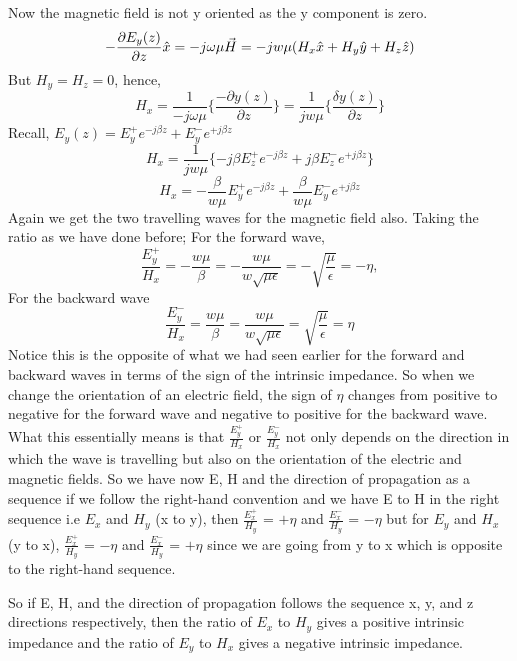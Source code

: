 Now the magnetic field is not y oriented as the y component is zero.
\begin{dmath*}
-\pdv{E_y(z)}{z}\hat{x} = -j\omega\mu\vec{H} = -jw\mu (H_x\hat{x} + H_y\hat{y} + H_z\hat{z}) 
\end{dmath*}
But	$H_y = H_z = 0$, hence,
\begin{dmath*}
H_x = \frac{1}{-j\omega\mu}\{\frac{-\partial y(z)}{\partial z}\} = \frac{1}{jw\mu}\{\frac{\delta y(z)}{\partial z}\}
\end{dmath*} 
Recall,
$E_y(z) = E_y^+ e^{-j\beta z} + E_y^- e^{+j\beta z}$
\begin{dmath*}
H_x= \frac{1}{jw\mu} \{-j\beta E_z^+e^{-j\beta z} + j\beta E_z^-e^{+j\beta z} \}
\end{dmath*}
\begin{dmath*}
H_x = - \frac{\beta}{w\mu} E_y^+e^{-j\beta z} +\frac{\beta}{w\mu}E_y^-e^{+j\beta z}
\end{dmath*}
Again we get the two travelling waves for the magnetic field also. Taking the ratio as we have done before; 
For the forward wave,
\begin{dmath*}
\frac{E_y^+}{H_x} = -\frac{w\mu}{\beta} = -\frac{w\mu}{w\sqrt{\mu \epsilon}} = -\sqrt{\frac{\mu}{\epsilon}} = -\eta,
\end{dmath*}
For the backward wave
\begin{dmath*}
\frac{E_y^-}{H_x} = \frac{w\mu}{\beta} = \frac{w\mu}{w\sqrt{\mu \epsilon}} = \sqrt{\frac{\mu}{\epsilon}} = \eta
\end{dmath*}
Notice this is the opposite of what we had seen earlier for the forward and backward waves in terms of the sign of the intrinsic impedance. So when we change the orientation of an electric field, the sign of $\eta$ changes from positive to negative for the forward wave and negative to positive for the backward wave. What this essentially means is that $\frac{E_y^+}{H_x}$ or $\frac{E_y^-}{H_x}$ not only depends on the direction in which the wave is travelling but also on the orientation of the electric and magnetic fields. So we have now E, H and the direction of propagation as a sequence if we follow the right-hand convention and we have E to H in the right sequence i.e $E_x$ and $H_y$ (x to y), then $\frac{E_x^+}{H_y}$ = $+\eta$ and $\frac{E_x^-}{H_y}$ = $-\eta$ but for $E_y$ and $H_x$ (y to x), $\frac{E_x^+}{H_y}$ = $-\eta$ and $\frac{E_x^-}{H_y}$ = $+\eta$ since we are going from y to x which is opposite to the right-hand sequence.

So if E, H, and the direction of propagation follows the sequence x, y, and z directions respectively, then the ratio of $E_x$ to $H_y$ gives a positive intrinsic impedance and the ratio of $E_y$ to $H_x$ gives a negative intrinsic impedance. 

